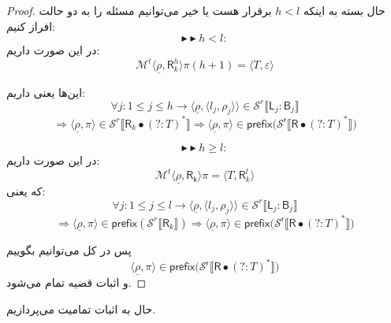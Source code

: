 \begin{proof}
حال بسته به اینکه $h<l$ برقرار هست یا خیر می‌توانیم مسئله را به دو حالت افراز کنیم:
$$\blacktriangleright\blacktriangleright h<l:$$
در این صورت داریم:
$$\mathcal{M}^t \langle \underline{\rho}, \mathsf{R}_k^h \rangle \pi(h+1)=\langle \mathit{T} , \varepsilon \rangle$$

این‌ها یعنی داریم:
$$\forall j:1\leq j \leq h \rightarrow \langle \underline{\rho},\langle l_j, \rho_j \rangle\rangle \in \mathcal{S}^r \llbracket \mathsf{L}_j : \mathsf{B}_j \rrbracket$$
$$\Rightarrow \langle \underline{\rho}, \pi \rangle \in \mathcal{S}^r \llbracket \mathsf{R}_k \bullet (?:\mathit{T})^* \rrbracket \Rightarrow \langle \underline{\rho},\pi\rangle \in \mathsf{prefix(\mathcal{S}^r \llbracket R \bullet (?:\mathit{T})^*} \rrbracket)$$ 

$$\blacktriangleright\blacktriangleright h\geq l:$$
در این صورت داریم:
$$\mathcal{M}^t \langle\underline{\rho},\mathsf{R_k}\rangle \pi = \langle \mathit{T}, \mathsf{R}_k^l\rangle$$
که یعنی:
$$\forall j:1\leq j \leq l \rightarrow \langle \underline{\rho},\langle l_j, \rho_j \rangle\rangle \in \mathcal{S}^r \llbracket \mathsf{L}_j : \mathsf{B}_j \rrbracket$$
$$\Rightarrow \langle \underline{\rho}, \pi \rangle \in \mathsf{prefix}(\mathcal{S}^r \llbracket \mathsf{R}_k\rrbracket) \Rightarrow \langle \underline{\rho},\pi\rangle \in \mathsf{prefix(\mathcal{S}^r \llbracket R \bullet (?:\mathit{T})^*} \rrbracket)$$ 

پس در کل می‌توانیم بگوییم
$$\langle \underline{\rho},\pi\rangle \in \mathsf{prefix(\mathcal{S}^r \llbracket R \bullet (?:\mathit{T})^*} \rrbracket)$$
و اثبات قضیه تمام می‌شود.
\end{proof}

حال به اثبات تمامیت می‌پردازیم.

